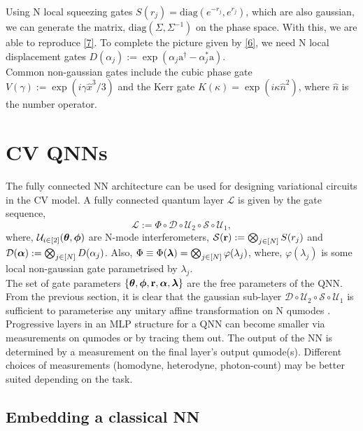 \documentclass[11pt,oneside]{article}
\theoremstyle{definition}
\theoremstyle{definition}
\newcommand{\U}{\mathcal{U}}
\newcommand{\Lay}{\mathcal{L}}
\newcommand{\xop}{\hat{x}}
\newcommand{\nop}{\hat{n}}
\newcommand{\Sq}{\mathcal{S}}
\newcommand{\D}{\mathcal{D}}
\newcommand{\ann}{\mathrm{a}}
\newcommand{\crt}{\mathrm{a}^\dagger}
\newcommand{\diag}{\mathrm{diag}}
\newcommand{\internal}[1]{\ifdefined\publish\else{{\color{red}{#1}}}\fi}
\begin{document}
Using N local squeezing gates $S(r_j) = \diag\left(e^{-r_j}, e^{r_j}\right)$, which are also gaussian, we can generate the matrix, $\diag\left(\Sigma, \Sigma^{-1}\right)$ on the phase space. With this, we are able to reproduce \eqref{7}. To complete the picture given by \eqref{6}, we need N local displacement gates $D(\alpha_j) := \exp(\alpha_j \crt - \alpha_j^* \ann)$. \\

Common non-gaussian gates include the cubic phase gate $V(\gamma) := \exp(i \gamma \xop^3/3)$ and the Kerr gate $K(\kappa) = \exp(i \kappa \nop^2)$, where $\nop$ is the number operator.

\section{CV QNNs}

The fully connected NN architecture can be used for designing variational circuits in the CV model. A fully connected quantum layer $\Lay$ is given by the gate sequence,
\begin{equation}
    \Lay := \Phi \circ \D \circ \U_2 \circ \Sq \circ \U_1,
\end{equation}
where, $\U_{i \in [2]}(\vb*{\theta}, \vb*{\phi})$ are N-mode interferometers, $\Sq(\vb{r}) := \bigotimes_{j \in [N]} S(r_j)$ and $\D(\vb*{\alpha}) := \bigotimes_{j \in [N]} D(\alpha_j)$. Also, $\Phi \equiv \Phi(\vb*{\lambda}) = \bigotimes_{j \in [N]} \varphi(\lambda_j)$, where, $\varphi(\lambda_j)$ is some local non-gaussian gate parametrised by $\lambda_j$. \\

The set of gate parameters $\{\vb*{\theta}, \vb*{\phi}, \vb{r}, \vb*{\alpha}, \vb*{\lambda}\}$ are the free parameters of the QNN. From the previous section, it is clear that the gaussian sub-layer $\D \circ \U_2 \circ \Sq \circ \U_1$ is sufficient to parameterise any unitary affine transformation on N qumodes \internal{\eqref{6} in the phase space picture}. \\

Progressive layers in an MLP structure for a QNN can become smaller via measurements on qumodes or by tracing them out. The output of the NN is determined by a measurement on the final layer's output qumode(s). \internal{It would probably be a good idea to add a schematic to show how these things look.} Different choices of measurements (homodyne, heterodyne, photon-count) may be better suited depending on the task. 

\subsection{Embedding a classical NN}
\label{3.1}
\end{document}
